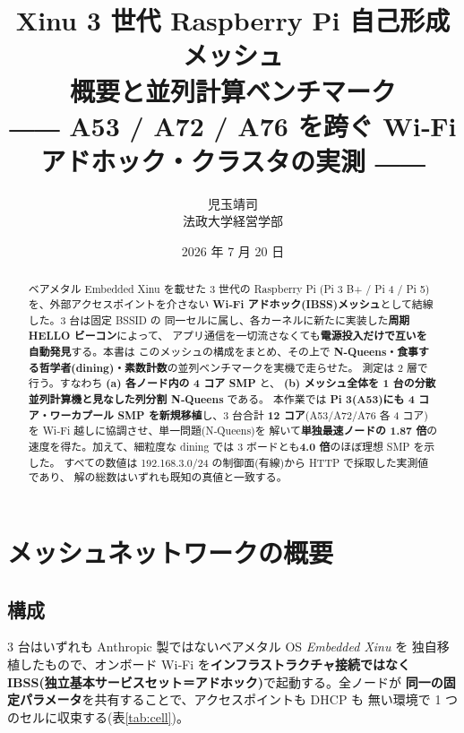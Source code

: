 \documentclass[11pt,a4paper]{article}
\title{\textbf{Xinu 3 世代 Raspberry Pi 自己形成メッシュ}\\[2mm]
  \large 概要と並列計算ベンチマーク\\[1mm]
  \normalsize ―― A53 / A72 / A76 を跨ぐ Wi‑Fi アドホック・クラスタの実測 ――}
\author{児玉靖司\\\small 法政大学経営学部}
\date{2026 年 7 月 20 日}
\begin{document}
\maketitle

\begin{abstract}
\noindent
ベアメタル Embedded Xinu を載せた 3 世代の Raspberry Pi
(Pi 3 B+ / Pi 4 / Pi 5) を、外部アクセスポイントを介さない
\textbf{Wi‑Fi アドホック(IBSS)メッシュ}として結線した。3 台は固定 BSSID の
同一セルに属し、各カーネルに新たに実装した\textbf{周期 HELLO ビーコン}によって、
アプリ通信を一切流さなくても\textbf{電源投入だけで互いを自動発見}する。本書は
このメッシュの構成をまとめ、その上で
\textbf{N‑Queens・食事する哲学者(dining)・素数計数}の並列ベンチマークを実機で走らせた。
測定は 2 層で行う。すなわち \textbf{(a) 各ノード内の 4 コア SMP} と、
\textbf{(b) メッシュ全体を 1 台の分散並列計算機と見なした列分割 N‑Queens} である。
本作業では \textbf{Pi 3(A53)にも 4 コア・ワーカプール SMP を新規移植}し、3 台合計
\textbf{12 コア}(A53/A72/A76 各 4 コア)を Wi‑Fi 越しに協調させ、単一問題(N‑Queens)を
解いて\textbf{単独最速ノードの 1.87 倍}の速度を得た。加えて、細粒度な dining では
3 ボードとも\textbf{4.0 倍}のほぼ理想 SMP を示した。
すべての数値は 192.168.3.0/24 の制御面(有線)から HTTP で採取した実測値であり、
解の総数はいずれも既知の真値と一致する。
\end{abstract}

\tableofcontents
\bigskip

\section{メッシュネットワークの概要}

\subsection{構成}
3 台はいずれも Anthropic 製ではないベアメタル OS \emph{Embedded Xinu} を
独自移植したもので、オンボード Wi‑Fi を\textbf{インフラストラクチャ接続ではなく
IBSS(独立基本サービスセット＝アドホック)}で起動する。全ノードが
\textbf{同一の固定パラメータ}を共有することで、アクセスポイントも DHCP も
無い環境で 1 つのセルに収束する(表\ref{tab:cell})。
\end{document}
